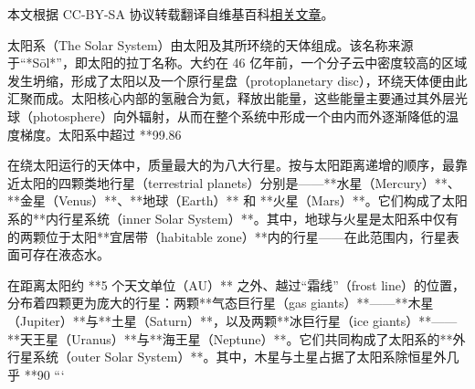 
本文根据 CC-BY-SA 协议转载翻译自维基百科\href{https://en.wikipedia.org/wiki/Solar_System}{相关文章}。


太阳系（The Solar System）由太阳及其所环绕的天体组成。该名称来源于“*Sōl*”，即太阳的拉丁名称。大约在 46 亿年前，一个分子云中密度较高的区域发生坍缩，形成了太阳以及一个原行星盘（protoplanetary disc），环绕天体便由此汇聚而成。太阳核心内部的氢融合为氦，释放出能量，这些能量主要通过其外层光球（photosphere）向外辐射，从而在整个系统中形成一个由内而外逐渐降低的温度梯度。太阳系中超过 **99.86%

在绕太阳运行的天体中，质量最大的为八大行星。按与太阳距离递增的顺序，最靠近太阳的四颗类地行星（terrestrial planets）分别是——**水星（Mercury）**、**金星（Venus）**、**地球（Earth）** 和 **火星（Mars）**。它们构成了太阳系的**内行星系统（inner Solar System）**。其中，地球与火星是太阳系中仅有的两颗位于太阳**宜居带（habitable zone）**内的行星——在此范围内，行星表面可存在液态水。

在距离太阳约 **5 个天文单位（AU）** 之外、越过“霜线”（frost line）的位置，分布着四颗更为庞大的行星：两颗**气态巨行星（gas giants）**——**木星（Jupiter）**与**土星（Saturn）**，以及两颗**冰巨行星（ice giants）**——**天王星（Uranus）**与**海王星（Neptune）**。它们共同构成了太阳系的**外行星系统（outer Solar System）**。其中，木星与土星占据了太阳系除恒星外几乎 **90%
```
